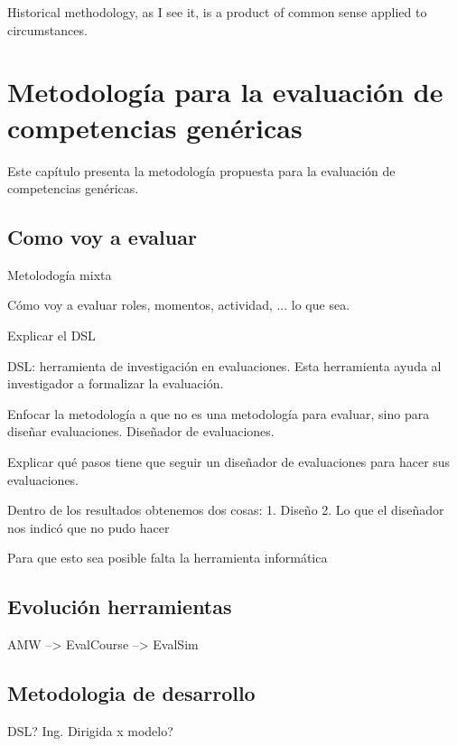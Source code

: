

\begin{savequote}[50mm]
Historical methodology, as I see it, is a product of common sense applied to circumstances. 
\end{savequote}


\chapter{Metodología para la evaluación de competencias genéricas}
\label{cha:Overall methodology}

\ifpdf
    \graphicspath{{4_overall_methodology/figures/PNG/}{4_overall_methodology/figures/PDF/}{4_overall_methodology/figures/}}
\else
    \graphicspath{{4_overall_methodology/figures/EPS/}{4_overall_methodology/figures/}}
\fi



\cite{turing1950computing}

Este capítulo presenta la metodología propuesta para la evaluación de competencias genéricas.

\section{Como voy a evaluar}

Metolodogía mixta

Cómo voy a evaluar roles, momentos, actividad, ... lo que sea.

Explicar el DSL

DSL: herramienta de investigación en evaluaciones. Esta herramienta ayuda al investigador a formalizar la evaluación.
 
Enfocar la metodología a que no es una metodología para evaluar, sino para diseñar evaluaciones. Diseñador de evaluaciones.

Explicar qué pasos tiene que seguir un diseñador de evaluaciones para hacer sus evaluaciones.

Dentro de los resultados obtenemos dos cosas:
1. Diseño
2. Lo que el diseñador nos indicó que no pudo hacer

Para que esto sea posible falta la herramienta informática

\section{Evolución herramientas}

AMW --> EvalCourse --> EvalSim

\section{Metodologia de desarrollo}

DSL? Ing. Dirigida x modelo?




